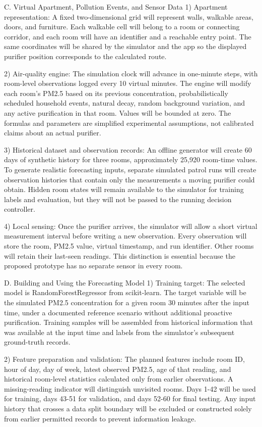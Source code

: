 C. Virtual Apartment, Pollution Events, and Sensor Data
1) Apartment representation:
A fixed two-dimensional grid will represent walls, walkable areas, doors, and furniture. Each walkable cell will belong to a room or connecting corridor, and each room will have an identifier and a reachable entry point. The same coordinates will be shared by the simulator and the app so the displayed purifier position corresponds to the calculated route.

2) Air-quality engine:
The simulation clock will advance in one-minute steps, with room-level observations logged every 10 virtual minutes. The engine will modify each room's PM2.5 based on its previous concentration, probabilistically scheduled household events, natural decay, random background variation, and any active purification in that room. Values will be bounded at zero. The formulas and parameters are simplified experimental assumptions, not calibrated claims about an actual purifier.

3) Historical dataset and observation records:
An offline generator will create 60 days of synthetic history for three rooms, approximately 25,920 room-time values. To generate realistic forecasting inputs, separate simulated patrol runs will create observation histories that contain only the measurements a moving purifier could obtain. Hidden room states will remain available to the simulator for training labels and evaluation, but they will not be passed to the running decision controller.

4) Local sensing:
Once the purifier arrives, the simulator will allow a short virtual measurement interval before writing a new observation. Every observation will store the room, PM2.5 value, virtual timestamp, and run identifier. Other rooms will retain their last-seen readings. This distinction is essential because the proposed prototype has no separate sensor in every room.

D. Building and Using the Forecasting Model
1) Training target:
The selected model is RandomForestRegressor from scikit-learn. The target variable will be the simulated PM2.5 concentration for a given room 30 minutes after the input time, under a documented reference scenario without additional proactive purification. Training samples will be assembled from historical information that was available at the input time and labels from the simulator's subsequent ground-truth records.

2) Feature preparation and validation:
The planned features include room ID, hour of day, day of week, latest observed PM2.5, age of that reading, and historical room-level statistics calculated only from earlier observations. A missing-reading indicator will distinguish unvisited rooms. Days 1-42 will be used for training, days 43-51 for validation, and days 52-60 for final testing. Any input history that crosses a data split boundary will be excluded or constructed solely from earlier permitted records to prevent information leakage.


